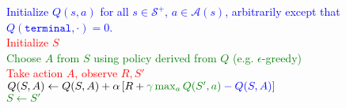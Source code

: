 \documentclass{standalone}
\begin{document}
\pagestyle{empty}
\begin{algorithm}[H]
  \KwInput{Step size $\alpha \in (0, 1]$, and a small $\epsilon > 0$.}
  \textcolor{blue}{Initialize $Q(s,a)$ for all $s \in \mathcal S^+$, $a \in \mathcal A(s)$,   arbitrarily except that $Q(\texttt{terminal}, \cdot) = 0$.\\}
 {
  \textcolor{red}{Initialize $S$} \\
   {
\textcolor{Green}{Choose $A$ from $S$ using policy derived from $Q$ (e.g. $\epsilon$-greedy)} \\
\textcolor{red}{Take action $A$, observe $R, S'$ \\}
\textcolor{blue}{
    $Q(S,A) \gets Q(S,A) + \alpha \left[R + \color{Green}{\gamma \max_a Q(S', a)} \color{blue} -       Q(S,A)\right]$ \\}
    \textcolor{Green}{$S \gets S'$} 
  }
}
\end{algorithm}
\end{document}
